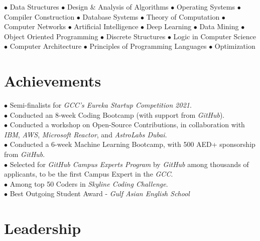 \documentclass[a4paper,11pt]{article}
\begin{document}
\small{

{$\bullet$ Data Structures $\bullet$ Design \& Analysis of Algorithms $\bullet$ Operating Systems $\bullet$ Compiler Construction $\bullet$ Database Systems $\bullet$ Theory of Computation $\bullet$ Computer Networks $\bullet$ Artificial Intelligence $\bullet$ Deep Learning $\bullet$ Data Mining $\bullet$ Object Oriented Programming $\bullet$ Discrete Structures $\bullet$ Logic in Computer Science $\bullet$ Computer Architecture $\bullet$ Principles of Programming Languages $\bullet$ Optimization}\\


}

\vspace{-2.5mm}

\section{Achievements}

\vspace{0.2mm}

\small{

{$\bullet$ Semi-finalists for \textit{GCC’s Eureka Startup Competition 2021}.}\\
{$\bullet$ Conducted an 8-week Coding Bootcamp (with support from \textit{GitHub}).}\\
{$\bullet$ Conducted a workshop on Open-Source Contributions, in collaboration with \textit{IBM}, \textit{AWS}, \textit{Microsoft Reactor}, and \textit{AstroLabs Dubai}.}\\
{$\bullet$ Conducted a 6-week Machine Learning Bootcamp, with 500 AED+ sponsorship from \textit{GitHub}.}\\
{$\bullet$ Selected for \textit{GitHub Campus Experts Program} by \textit{GitHub} among thousands of applicants, to be the first Campus Expert in the \textit{GCC}.}\\
{$\bullet$ Among top 50 Coders in \textit{Skyline Coding Challenge}.}\\
{$\bullet$ Best Outgoing Student Award - \textit{Gulf Asian English School}}\\

}

\vspace{-2.5mm}


\section{Leadership}
\end{document}
